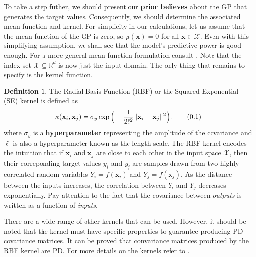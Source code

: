 \documentclass[10pt]{article}
\theoremstyle{definition}
\newtheorem{defn}{Definition}[section]
\newcommand\eqnum{\addtocounter{equation}{1}\tag{\arabic{section}.\arabic{equation}}}
\begin{document}
To take a step futher, we should present our \textbf{prior believes} about the GP that generates the target values. Consequently, we should determine the associated mean function and kernel. For simplicity in our calculations, let us assume that the mean function of the GP is zero, so $\mu(\mathbf{x})=0$ for all $\mathbf{x}\in\mathcal{X}$. Even with this simplifying assumption, we shall see that the model's predictive power is good enough. For a more general mean function formulation consult \cite[Section 2.7]{Rasmussen2006}. Note that the index set $\mathcal{X}\subseteq\mathbb{R}^d$ is now just the input domain. The only thing that remains to specify is the kernel function.
\begin{defn}
The Radial Basis Function (RBF) or the Squared Exponential (SE) kernel is defined as
\begin{equation*}
\kappa(\mathbf{x}_i,\mathbf{x}_j) = \sigma_y \exp \Big(-\frac{1}{2\ell^2} \lVert\mathbf{x}_i-\mathbf{x}_j\rVert^2\Big),
\eqnum
\label{eq:RBF}
\end{equation*}
where $\sigma_y$ is a \textbf{hyperparameter} representing the amplitude of the covariance and $\ell$ is also a hyperparameter known as the length-scale. The RBF kernel encodes the intuition that if $\mathbf{x}_i$ and $\mathbf{x}_j$ are close to each other in the input space $\mathcal{X}$, then their correponding target values $y_i$ and $y_j$ are samples drawn from two highly correlated random variables $Y_i=f(\mathbf{x}_i)$ and $Y_j=f(\mathbf{x}_j)$. As the distance between the inputs increases, the correlation between $Y_i$ and $Y_j$ decreases exponentially. Pay attention to the fact that the covariance between \textit{outputs} is written as a function of \textit{inputs}.
\end{defn}
There are a wide range of other kernels that can be used. However, it should be noted that the kernel must have specific properties to guarantee producing PD covariance matrices. It can be proved that convariance matrices produced by the RBF kernel are PD. For more details on the kernels refer to \cite[Chapter 4]{Rasmussen2006}.
\end{document}
